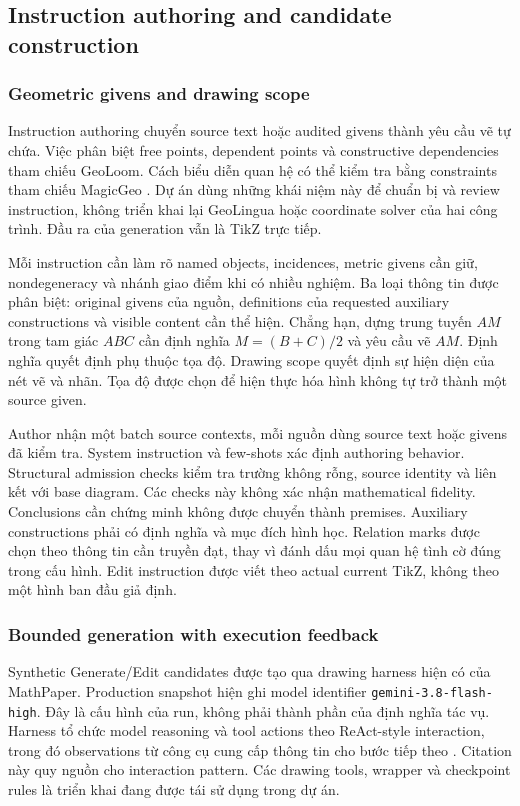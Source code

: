 \documentclass[a4paper,12pt]{article}
\begin{document}
\subsection{Instruction authoring and candidate construction}
\subsubsection{Geometric givens and drawing scope}
\label{sec:information-selection}
Instruction authoring chuyển source text hoặc audited givens thành yêu cầu vẽ tự chứa. Việc phân biệt free points, dependent points và constructive dependencies tham chiếu GeoLoom. Cách biểu diễn quan hệ có thể kiểm tra bằng constraints tham chiếu MagicGeo \cite{ref3,magicgeo}. Dự án dùng những khái niệm này để chuẩn bị và review instruction, không triển khai lại GeoLingua hoặc coordinate solver của hai công trình. Đầu ra của generation vẫn là TikZ trực tiếp.

Mỗi instruction cần làm rõ named objects, incidences, metric givens cần giữ, nondegeneracy và nhánh giao điểm khi có nhiều nghiệm. Ba loại thông tin được phân biệt: original givens của nguồn, definitions của requested auxiliary constructions và visible content cần thể hiện. Chẳng hạn, dựng trung tuyến $AM$ trong tam giác $ABC$ cần định nghĩa $M=(B+C)/2$ và yêu cầu vẽ $AM$. Định nghĩa quyết định phụ thuộc tọa độ. Drawing scope quyết định sự hiện diện của nét vẽ và nhãn. Tọa độ được chọn để hiện thực hóa hình không tự trở thành một source given.

Author nhận một batch source contexts, mỗi nguồn dùng source text hoặc givens đã kiểm tra. System instruction và few-shots xác định authoring behavior. Structural admission checks kiểm tra trường không rỗng, source identity và liên kết với base diagram. Các checks này không xác nhận mathematical fidelity. Conclusions cần chứng minh không được chuyển thành premises. Auxiliary constructions phải có định nghĩa và mục đích hình học. Relation marks được chọn theo thông tin cần truyền đạt, thay vì đánh dấu mọi quan hệ tình cờ đúng trong cấu hình. Edit instruction được viết theo actual current TikZ, không theo một hình ban đầu giả định.

\subsubsection{Bounded generation with execution feedback}
\label{sec:drawing-workflow}
Synthetic Generate/Edit candidates được tạo qua drawing harness hiện có của MathPaper. Production snapshot hiện ghi model identifier \texttt{gemini-3.8-flash-high}. Đây là cấu hình của run, không phải thành phần của định nghĩa tác vụ. Harness tổ chức model reasoning và tool actions theo ReAct-style interaction, trong đó observations từ công cụ cung cấp thông tin cho bước tiếp theo \cite{react}. Citation này quy nguồn cho interaction pattern. Các drawing tools, wrapper và checkpoint rules là triển khai đang được tái sử dụng trong dự án.
\end{document}

